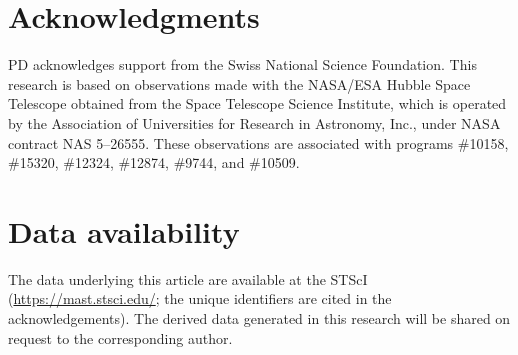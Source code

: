   
  
  
  
  
  
  
  
  

  \section*{Acknowledgments}
  PD acknowledges support from the Swiss National Science Foundation.  This
  research is based on observations made with the NASA/ESA Hubble Space
  Telescope obtained from the Space Telescope Science Institute, which is
  operated by the Association of Universities for Research in Astronomy, Inc.,
  under NASA contract NAS 5–26555. These observations are associated with
  programs \#10158, \#15320, \#12324, \#12874, \#9744, and \#10509.

  \section*{Data availability}
  The data underlying this article are available at the STScI
  (\href{https://mast.stsci.edu/}{https://mast.stsci.edu/}; the unique
  identifiers are cited in the acknowledgements).  The derived data generated in
  this research will be shared on request to the corresponding author.
  
  
